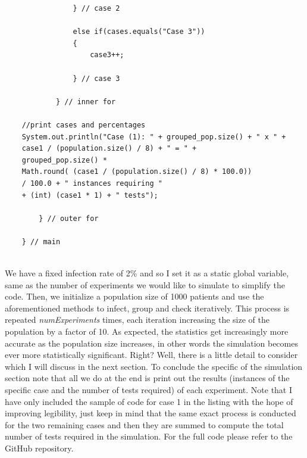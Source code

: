 \documentclass[letterpaper, 10pt]{article}
\begin{document}
\begin{lstlisting}
	            } // case 2 
	            
	            else if(cases.equals("Case 3"))
	            {
	                case3++;
	                
	            } // case 3
	
	        } // inner for
	        
    //print cases and percentages
    System.out.println("Case (1): " + grouped_pop.size() + " x " + 
    case1 / (population.size() / 8) + " = " + 
    grouped_pop.size() * 
    Math.round( (case1 / (population.size() / 8) * 100.0)) 
    / 100.0 + " instances requiring " 
    + (int) (case1 * 1) + " tests");
	       
	    } // outer for

	} // main
\end{lstlisting}
\\
We have a fixed infection rate of 2\% and so I set it as a static global variable, same as the number of experiments we would like to simulate to simplify the code. Then, we initialize a population size of 1000 patients and use the aforementioned methods to infect, group and check iteratively. This process is repeated \textit{numExperiments} times, each iteration increasing the size of the population by a factor of 10. As expected, the statistics get increasingly more accurate as the population size increases, in other words the simulation becomes ever more statistically significant. Right? Well, there is a little detail to consider which I will discuss in the next section. To conclude the specific of the simulation section note that all we do at the end is print out the results (instances of the specific case and the number of tests required) of each experiment. Note that I have only included the sample of code for case 1 in the listing with the hope of improving legibility, just keep in mind that the same exact process is conducted for the two remaining cases and then they are summed to compute the total number of tests required in the simulation. For the full code please refer to the GitHub repository.
\\
\end{document}
